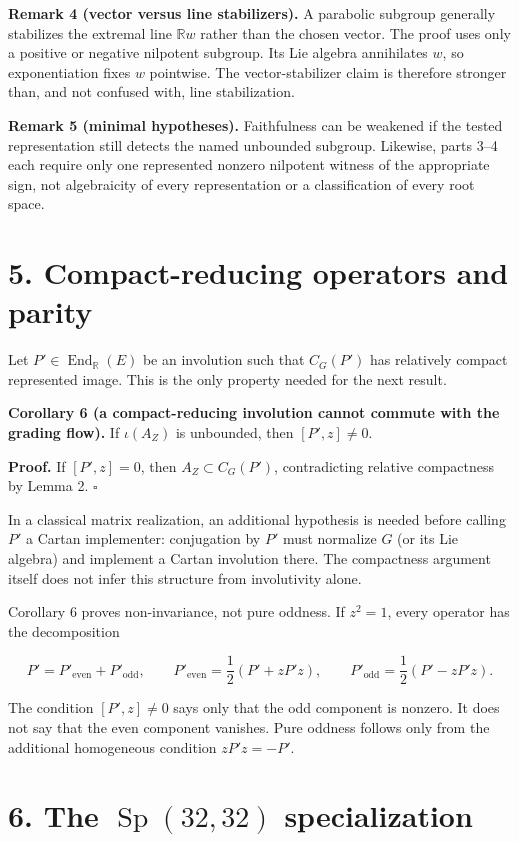 \documentclass[
  10pt,
  letterpaper,
  oneside]{scrartcl}
\begin{document}
\textbf{Remark 4 (vector versus line stabilizers).} A parabolic subgroup
generally stabilizes the extremal line \(\mathbb Rw\) rather than the
chosen vector. The proof uses only a positive or negative nilpotent
subgroup. Its Lie algebra annihilates \(w\), so exponentiation fixes
\(w\) pointwise. The vector-stabilizer claim is therefore stronger than,
and not confused with, line stabilization.

\textbf{Remark 5 (minimal hypotheses).} Faithfulness can be weakened if
the tested representation still detects the named unbounded subgroup.
Likewise, parts 3--4 each require only one represented nonzero nilpotent
witness of the appropriate sign, not algebraicity of every
representation or a classification of every root space.

\section{5. Compact-reducing operators and
parity}\label{compact-reducing-operators-and-parity}

Let \(P'\in\operatorname{End}_{\mathbb R}(E)\) be an involution such
that \(C_G(P')\) has relatively compact represented image. This is the
only property needed for the next result.

\textbf{Corollary 6 (a compact-reducing involution cannot commute with
the grading flow).} If \(\iota(A_Z)\) is unbounded, then \([P',z]\ne0\).

\textbf{Proof.} If \([P',z]=0\), then \(A_Z\subset C_G(P')\),
contradicting relative compactness by Lemma 2. \(\square\)

In a classical matrix realization, an additional hypothesis is needed
before calling \(P'\) a Cartan implementer: conjugation by \(P'\) must
normalize \(G\) (or its Lie algebra) and implement a Cartan involution
there. The compactness argument itself does not infer this structure
from involutivity alone.

Corollary 6 proves non-invariance, not pure oddness. If \(z^2=1\), every
operator has the decomposition

\[
P'=P'_{\mathrm{even}}+P'_{\mathrm{odd}},
\qquad
P'_{\mathrm{even}}=\frac12(P'+zP'z),
\qquad
P'_{\mathrm{odd}}=\frac12(P'-zP'z).
\]

The condition \([P',z]\ne0\) says only that the odd component is
nonzero. It does not say that the even component vanishes. Pure oddness
follows only from the additional homogeneous condition \(zP'z=-P'\).

\section{\texorpdfstring{6. The \(\operatorname{Sp}(32,32)\)
specialization}{6. The \textbackslash operatorname\{Sp\}(32,32) specialization}}\label{the-operatornamesp3232-specialization}
\end{document}
